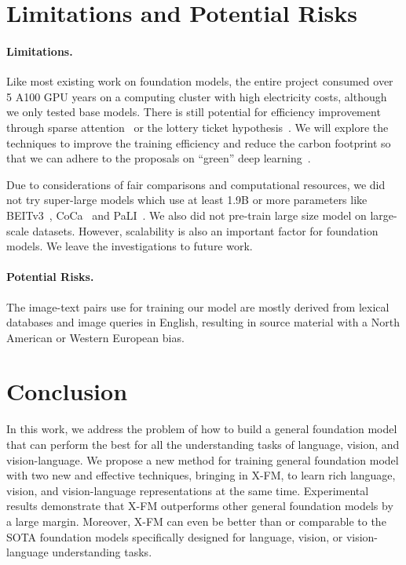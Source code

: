 \documentclass[11pt]{article}
\newcommand{\ModelName}{X-FM\xspace}
\begin{document}
\section{Limitations and Potential Risks}
\label{appendix:limitations}

\paragraph{Limitations.}
Like most existing work on foundation models, the entire project consumed over 5 A100 GPU years on a computing cluster with high electricity costs, although we only tested base models. There is still potential for efficiency improvement through sparse attention~\citep{zaheer2020big} or the lottery ticket hypothesis~\citep{frankle2018lottery}. We will explore the techniques to improve the training efficiency and reduce the carbon footprint so that we can adhere to the proposals on ``green'' deep learning~\citep{schwartz2020green,xu2021survey}.

Due to considerations of fair comparisons and computational resources, we did not try super-large models which use at least 1.9B or more parameters like BEITv3~\citep{wang2022image}, CoCa~\citep{yu2022coca} and PaLI~\citep{chen2022pali}. We also did not pre-train large size model on large-scale datasets. However, scalability is also an important factor for foundation models. We leave the investigations to future work.


\paragraph{Potential Risks.}
The image-text pairs use for training our model are mostly derived from lexical databases and image queries in English, resulting in source material with a North
American or Western European bias.


\section{Conclusion}




In this work, we address the problem of how to build a general foundation model that can perform the best for all the understanding tasks of language, vision, and vision-language. We propose a new method for training general foundation model with two new and effective techniques, bringing in {\ModelName}, to learn rich language, vision, and vision-language representations at the same time. Experimental results demonstrate that {\ModelName} outperforms other general foundation models by a large margin. Moreover, {\ModelName} can even be better than or comparable to the SOTA foundation models specifically designed for language, vision, or vision-language understanding tasks. 
\end{document}
